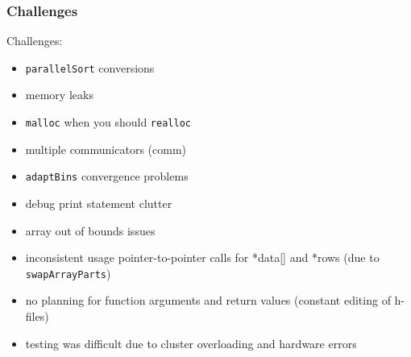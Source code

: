\documentclass[usernames,dvipsnames]{beamer}
\begin{document}
\begin{frame}	
	\frametitle{Challenges}
	
	\begin{alertblock}{Challenges:}
		\begin{itemize}
			\item \texttt{parallelSort} conversions
			\item memory leaks
			\item \texttt{malloc} when you should \texttt{realloc}
			\item multiple communicators (comm)
			\item \texttt{adaptBins} convergence problems
			\item debug print statement clutter
			\item array out of bounds issues
			\item inconsistent usage pointer-to-pointer calls for *data[] and *rows (due to \texttt{swapArrayParts})
			\item no planning for function arguments and return values (constant editing of h-files)
			\item testing was difficult due to cluster overloading and hardware errors
		\end{itemize}
	\end{alertblock}

\end{frame}
\end{document}
